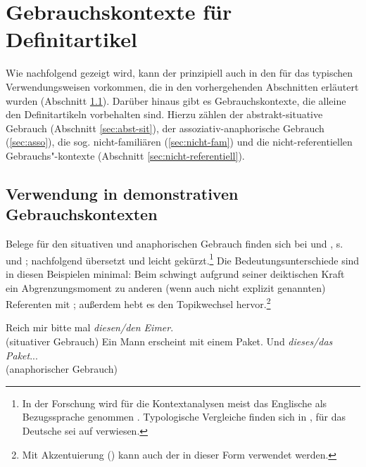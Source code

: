 \section{Gebrauchskontexte für Definitartikel}\label{sec:definitartikel}

Wie nachfolgend gezeigt wird, kann der  prinzipiell auch in den für das  typischen Verwendungsweisen vorkommen, die in den vorhergehenden Abschnitten erläutert wurden (Abschnitt \ref{sec:definitartikel-in-demonstrativ}). Darüber hinaus gibt es Gebrauchskontexte, die alleine den Definitartikeln vorbehalten sind. Hierzu zählen der abstrakt-situative Gebrauch  (Abschnitt \ref{sec:abst-sit}), der assoziativ-anaphorische  Gebrauch (\ref{sec:asso}), die sog. nicht-familiären (\ref{sec:nicht-fam}) und die nicht-referentiellen  Gebrauchs"-kontexte (Abschnitt \ref{sec:nicht-referentiell}). 

\subsection{Verwendung in demonstrativen Gebrauchskontexten}\label{sec:definitartikel-in-demonstrativ}

Belege für den situativen  und anaphorischen  Gebrauch finden sich bei \textcite[110--111]{Hawkins1978} und \textcite[36]{Himmelmann1997}, s.  und ; nachfolgend übersetzt und leicht gekürzt.\footnote{In der Forschung wird für die Kontextanalysen meist das Englische als Bezugssprache genommen \parencite{Christophersen1939, Lobner1985,Lyons1999}. Typologische Vergleiche finden sich in \textcite{Himmelmann1997}, für das Deutsche sei auf \textcite{Bisle-Muller1991} verwiesen.} Die Bedeutungsunterschiede sind in diesen Beispielen minimal: Beim  schwingt aufgrund seiner deiktischen Kraft ein Abgrenzungsmoment zu anderen (wenn auch nicht explizit genannten) Referenten mit \parencite{Bisle-Muller1991}; außerdem hebt es den Topikwechsel  hervor.\footnote{Mit Akzentuierung () kann auch der  in dieser Form verwendet werden.}   

\begin{exe}
	\ex \label{ex:sitdef} Reich mir bitte mal \textit{diesen/den Eimer}.  \\(situativer  Gebrauch)
	\ex \label{ex:anadef} Ein Mann erscheint mit einem Paket. Und \textit{dieses/das Paket}... \\(anaphorischer Gebrauch)
\end{exe}

